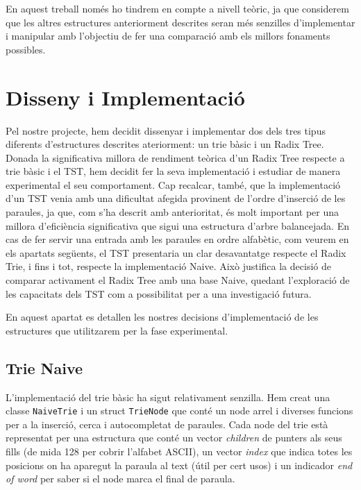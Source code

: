 En aquest treball només ho tindrem en compte a nivell teòric, ja que considerem que les altres estructures anteriorment descrites seran més senzilles d'implementar i manipular amb l'objectiu de fer una comparació amb els millors fonaments possibles. 

\section{Disseny i Implementació}
Pel nostre projecte, hem decidit dissenyar i implementar dos dels tres tipus diferents d'estructures descrites ateriorment: un trie bàsic i un Radix Tree.
Donada la significativa millora de rendiment teòrica d'un Radix Tree respecte a trie bàsic i el TST, hem decidit fer la seva implementació i estudiar de manera experimental el seu comportament. Cap recalcar, també, 
que la implementació d'un TST venia amb una dificultat afegida provinent de l'ordre d'inserció de les paraules, ja que, com s'ha descrit amb anterioritat, és molt important per una millora d'eficiència significativa que sigui una estructura d'arbre balancejada. 
En cas de fer servir una entrada amb les paraules en ordre alfabètic, com veurem en els apartats següents, el TST presentaria un clar desavantatge respecte el Radix Trie, i fins i tot, respecte la implementació Naive. 
Això justifica la decisió de comparar activament el Radix Tree amb una base Naive, quedant l'exploració de les capacitats dels TST com a possibilitat per a una investigació futura. 

En aquest apartat es detallen les nostres decisions d'implementació de les estructures que utilitzarem per la fase experimental.

\subsection{Trie Naive}
L'implementació del trie bàsic ha sigut relativament senzilla. Hem creat una classe \texttt{NaiveTrie} i un struct \texttt{TrieNode} que conté un node arrel i diverses funcions per a la inserció, cerca i autocompletat de paraules. 
Cada node del trie està representat per una estructura que conté un vector \textit{children} de punters als seus fills (de mida 128 per cobrir l'alfabet ASCII), un vector \textit{index} que indica totes les posicions on ha aparegut la paraula al text (útil per cert usos) i un indicador \textit{end of word} per saber si el node marca el final de paraula.

